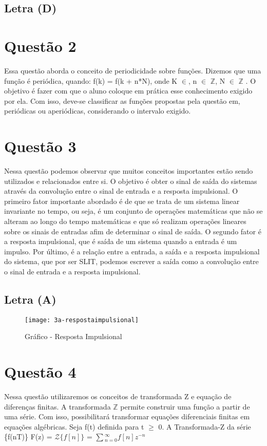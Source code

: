 \documentclass[12pt,a4paper]{article}
\begin{document}
	\subsection{Letra (D)}


\section{Questão 2}
Essa questão aborda o conceito de periodicidade sobre funções. Dizemos que uma função é periódica, quando: f(k) = f(k + n*N), onde K $\in$, n $\in$ $\mathbb{Z}$, N $\in$ $\mathbb{Z}$ .
O objetivo é fazer com que o aluno coloque em prática esse conhecimento exigido por ela. Com isso, deve-se classificar as funções propostas pela questão em, periódicas ou aperiódicas, considerando o intervalo exigido.

\section{Questão 3}
Nessa questão podemos observar que muitos conceitos importantes estão sendo utilizados e relacionados entre si. O objetivo é obter o sinal de saída do sistemas através da convolução entre o sinal de entrada e a resposta impulsional. O primeiro fator importante abordado é de que se trata de um sistema linear invariante no tempo, ou seja, é um conjunto de operações matemáticas que não se alteram ao longo do tempo matemáticas e que só realizam operações lineares sobre os sinais de entradas afim de determinar o sinal de saída. O segundo fator é a resposta impulsional, que é saída de um sistema quando a entrada é um impulso. Por último, é a relação entre a entrada, a saída e a resposta impulsional do sistema, que por ser SLIT, podemos escrever a saída como a convolução entre o sinal de entrada e a resposta impulsional.
	\subsection{Letra (A)}
		\begin{figure}[!ht]
				\centering
				\texttt{[image: 3a-respostaimpulsional]}
				\caption{Gráfico - Resposta Impulsional}
		\end{figure}

\section{Questão 4}
Nessa questão utilizaremos os conceitos de transformada Z e equação de diferenças finitas. A transformada 
$\mathbb{Z}$ permite construir uma função a partir de uma série. Com isso, possibilitará transformar equações diferenciais finitas em equações algébricas.
Seja f(t) definida para t $\ge$ 0. A Transformada-Z da série \{f(nT)\} 
F(z) = $\mathcal{Z}\{f[n]\}$ = $\sum{_{n=0}^{\infty} f[n] z^{-n}}$
\end{document}
